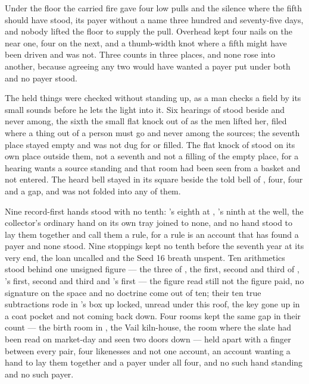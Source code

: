 Under the floor the carried fire gave four low pulls and the silence where the fifth should have stood, its payer without a name three hundred and seventy-five days, and nobody lifted the floor to supply the pull. Overhead  kept four nails on the near one, four on the next, and a thumb-width knot where a fifth might have been driven and was not. Three counts in three places, and none rose into another, because agreeing any two would have wanted a payer put under both and no payer stood.

\scenebreak

The held things were checked without standing up, as a man checks a field by its small sounds before he lets the light into it. Six hearings of  stood beside and never among, the sixth the small flat knock out of  as the men lifted her, filed where a thing out of a person must go and never among the sources; the seventh place stayed empty and was not dug for or filled. The flat knock of  stood on its own place outside them, not a seventh and not a filling of the empty place, for a hearing wants a source standing and that room had been seen from a basket and not entered. The heard bell stayed in its square beside the told bell of , four, four and a gap, and was not folded into any of them.

Nine record-first hands stood with no tenth: 's eighth at , 's ninth at the well, the collector's ordinary hand on its own tray joined to none, and no hand stood to lay them together and call them a rule, for a rule is an account that has found a payer and none stood. Nine stoppings kept no tenth before the seventh year at its very end, the loan uncalled and the Seed 16 breath unspent. Ten arithmetics stood behind one unsigned figure — the three of , the first, second and third of , 's first, second and third and 's first — the figure read still not the figure paid, no signature on the space and no doctrine come out of ten; their ten true subtractions rode in 's box up  locked, unread under this roof, the key gone up in a coat pocket and not coming back down. Four rooms kept the same gap in their count — the birth room in , the Vail kiln-house, the room where the slate had been read on market-day and  seen two doors down — held apart with a finger between every pair, four likenesses and not one account, an account wanting a hand to lay them together and a payer under all four, and no such hand standing and no such payer.


